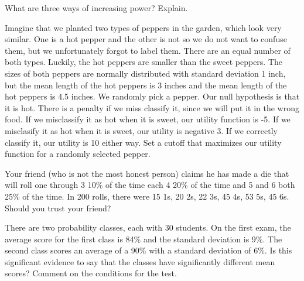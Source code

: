 \begin{exe} What are three ways of increasing power? Explain. \end{exe}

\begin{exe} Imagine that we planted two types of peppers in the garden, which look very similar.  One is a hot pepper and the other is not so we do not want to confuse them, but we unfortunately forgot to label them.  There are an equal number of both types.  Luckily, the hot peppers are smaller than the sweet peppers.  The sizes of both peppers are normally distributed with standard deviation 1 inch, but the mean length of the hot peppers is 3 inches and the mean length of the hot peppers is 4.5 inches.  We randomly pick a pepper. Our null hypothesis is that it is hot.  There  is a penalty if we miss classify it, since we will put it in the wrong food.  If we misclassify it as hot when it is sweet, our utility function is -5.  If we misclasify it as hot when it is sweet, our utility is negative 3.  If we correctly classify it, our utility is 10 either way.  Set a cutoff that maximizes our utility function for a randomly selected pepper. \end{exe}

\begin{exe} Your friend (who is not the most honest person) claims he has made a die that will roll one through 3 10\% of the time each 4 20\% of the time and 5 and 6 both 25\% of the time.  In 200 rolls, there were 15 1s, 20 2s, 22 3s, 45 4s, 53 5s, 45 6s. Should you trust your friend? \end{exe}

\begin{exe} There are two probability classes, each with 30 students.  On the first exam, the average score for the first class is 84\% and the standard deviation is 9\%.  The second class scores an average of a 90\% with a standard deviation of 6\%.  Is this significant evidence to say that the classes have significantly different mean scores?  Comment on the conditions for the test. \end{exe}
